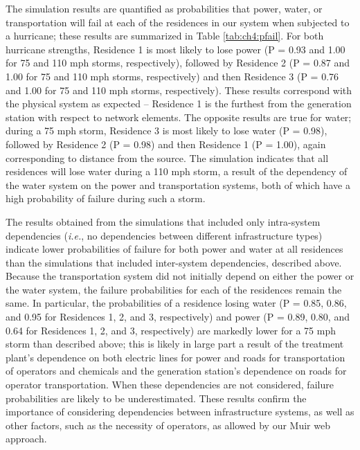 The simulation results are quantified as probabilities that power, water, or transportation will fail at each of the residences in our system when subjected to a hurricane; these results are summarized in Table \ref{tab:ch4:pfail}.  For both hurricane strengths, Residence 1 is most likely to lose power (P = 0.93 and 1.00 for 75 and 110 mph storms, respectively), followed by Residence 2 (P = 0.87 and 1.00 for 75 and 110 mph storms, respectively) and then Residence 3 (P = 0.76 and 1.00 for 75 and 110 mph storms, respectively).  These results correspond with the physical system as expected  --  Residence 1 is the furthest from the generation station with respect to network elements.  The opposite results are true for water; during a 75 mph storm, Residence 3 is most likely to lose water (P = 0.98), followed by Residence 2 (P = 0.98) and then Residence 1 (P = 1.00), again corresponding to distance from the source.  The simulation indicates that all residences will lose water during a 110 mph storm, a result of the dependency of the water system on the power and transportation systems, both of which have a high probability of failure during such a storm.

The results obtained from the simulations that included only intra-system dependencies (\emph{i.e.}, no dependencies between different infrastructure types) indicate lower probabilities of failure for both power and water at all residences than the simulations that included inter-system dependencies, described above.  Because the transportation system did not initially depend on either the power or the water system, the failure probabilities for each of the residences remain the same.  In particular, the probabilities of a residence losing water (P = 0.85, 0.86, and 0.95 for Residences 1, 2, and 3, respectively) and power (P = 0.89, 0.80, and 0.64 for Residences 1, 2, and 3, respectively) are markedly lower for a 75 mph storm than described above; this is likely in large part a result of the treatment plant’s dependence on both electric lines for power and roads for transportation of operators and chemicals and the generation station’s dependence on roads for operator transportation.  When these dependencies are not considered, failure probabilities are likely to be underestimated.  These results confirm the importance of considering dependencies between infrastructure systems, as well as other factors, such as the necessity of operators, as allowed by our Muir web approach.


